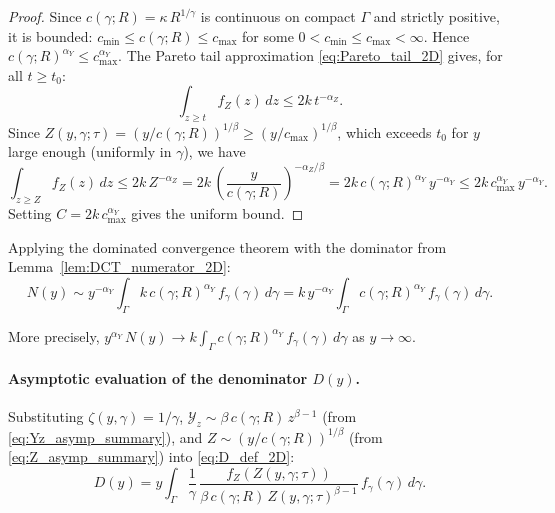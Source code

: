 \documentclass[12pt,a4paper]{article}
\theoremstyle{definition}
\theoremstyle{plain}
\theoremstyle{remark}
\newcommand{\calY}{\mathcal{Y}}
\begin{document}
\begin{proof}
Since $c(\gamma;R) = \kappa\,R^{1/\gamma}$ is continuous on compact $\Gamma$ and strictly positive, it is bounded: $c_{\min} \leq c(\gamma;R) \leq c_{\max}$ for some $0 < c_{\min} \leq c_{\max} < \infty$.  Hence $c(\gamma;R)^{\alpha_Y} \leq c_{\max}^{\alpha_Y}$.  The Pareto tail approximation \eqref{eq:Pareto_tail_2D} gives, for all $t \geq t_0$:
\[
  \int_{z \geq t} f_Z(z)\,dz \leq 2k\,t^{-\alpha_Z}.
\]
Since $Z(y,\gamma;\tau) = (y/c(\gamma;R))^{1/\beta} \geq (y/c_{\max})^{1/\beta}$, which exceeds $t_0$ for $y$ large enough (uniformly in $\gamma$), we have
\[
  \int_{z \geq Z} f_Z(z)\,dz \leq 2k\,Z^{-\alpha_Z} = 2k\,\left(\frac{y}{c(\gamma;R)}\right)^{-\alpha_Z/\beta} = 2k\,c(\gamma;R)^{\alpha_Y}\,y^{-\alpha_Y} \leq 2k\,c_{\max}^{\alpha_Y}\,y^{-\alpha_Y}.
\]
Setting $C = 2k\,c_{\max}^{\alpha_Y}$ gives the uniform bound.
\end{proof}

Applying the dominated convergence theorem with the dominator from Lemma~\ref{lem:DCT_numerator_2D}:
\begin{equation}
\label{eq:N_asymp_final}
  N(y) \sim y^{-\alpha_Y}\int_{\Gamma} k\,c(\gamma;R)^{\alpha_Y}\,f_{\gamma}(\gamma)\,d\gamma = k\,y^{-\alpha_Y}\int_{\Gamma} c(\gamma;R)^{\alpha_Y}\,f_{\gamma}(\gamma)\,d\gamma.
\end{equation}

More precisely, $y^{\alpha_Y}\,N(y) \to k\int_{\Gamma} c(\gamma;R)^{\alpha_Y}\,f_{\gamma}(\gamma)\,d\gamma$ as $y \to \infty$.

\paragraph{Asymptotic evaluation of the denominator $D(y)$.}

Substituting $\zeta(y,\gamma) = 1/\gamma$, $\calY_z \sim \beta\,c(\gamma;R)\,z^{\beta-1}$ (from \eqref{eq:Yz_asymp_summary}), and $Z \sim (y/c(\gamma;R))^{1/\beta}$ (from \eqref{eq:Z_asymp_summary}) into \eqref{eq:D_def_2D}:
\begin{equation}
\label{eq:D_step1}
  D(y) = y\int_{\Gamma} \frac{1}{\gamma}\,\frac{f_Z(Z(y,\gamma;\tau))}{\beta\,c(\gamma;R)\,Z(y,\gamma;\tau)^{\beta-1}}\,f_{\gamma}(\gamma)\,d\gamma.
\end{equation}
\end{document}
